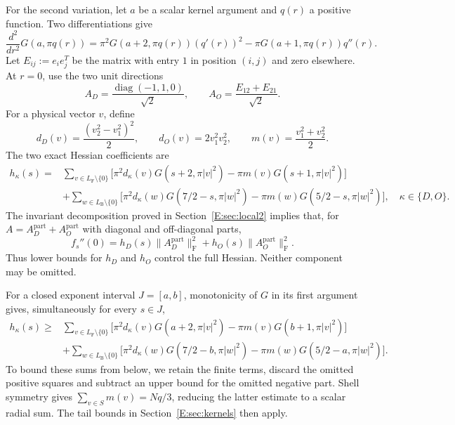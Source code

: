 \documentclass[reqno,english]{amsart}
\theoremstyle{definition}
\newtheorem{open problem}[theorem]{Open Problem}
\theoremstyle{remark}
\theoremstyle{plain}
\numberwithin{equation}{section}
\newcommand{\FCC}{L_{\mathrm F}}
\newcommand{\B}{L_{\mathrm B}}
\newcommand{\diag}{\operatorname{diag}}
\newcommand{\norm}[1]{\lVert#1\rVert_{\mathrm F}}
\begin{document}
For the second variation, let $a$ be a scalar kernel argument and
$q(r)$ a positive function. Two differentiations give
\begin{equation}
 \frac{d^2}{dr^2}G(a,\pi q(r))
 =\pi^2G(a+2,\pi q(r))(q'(r))^2
  -\pi G(a+1,\pi q(r))q''(r).
 \label{E:eq:second-variation-direct}
\end{equation}
Let $E_{ij}:=e_ie_j^T$ be the matrix with entry $1$ in position $(i,j)$
and zero elsewhere. At $r=0$, use the two unit directions
\[
 A_D=\frac{\diag(-1,1,0)}{\sqrt2},\qquad
 A_O=\frac{E_{12}+E_{21}}{\sqrt2}.
\]
For a physical vector $v$, define
\[
 d_D(v)=\frac{(v_2^2-v_1^2)^2}{2},\qquad
 d_O(v)=2v_1^2v_2^2,\qquad
 m(v)=\frac{v_1^2+v_2^2}{2}.
\]
The two exact Hessian coefficients are
\begin{align}
 h_\kappa(s)={}&
 \sum_{v\in\FCC\setminus\{0\}}
 \bigl[\pi^2d_\kappa(v)G(s+2,\pi|v|^2)
       -\pi m(v)G(s+1,\pi|v|^2)\bigr]\nonumber\\
 &+\sum_{w\in\B\setminus\{0\}}
 \bigl[\pi^2d_\kappa(w)G(7/2-s,\pi|w|^2)
       -\pi m(w)G(5/2-s,\pi|w|^2)\bigr],
 \quad\kappa\in\{D,O\}.
 \label{E:eq:hessian-explicit-new}
\end{align}
The invariant decomposition proved in Section~\ref{E:sec:local2} implies that,
for $A=A_D^{\mathrm{part}}+A_O^{\mathrm{part}}$ with diagonal and off-diagonal
parts,
\[
 f_s''(0)=h_D(s)\norm{A_D^{\mathrm{part}}}^2
          +h_O(s)\norm{A_O^{\mathrm{part}}}^2.
\]
Thus lower bounds for $h_D$ and $h_O$ control the full Hessian.
Neither component may be omitted.

For a closed exponent interval $J=[a,b]$, monotonicity of $G$ in its first
argument gives, simultaneously for every $s\in J$,
\begin{align}
 h_\kappa(s)\ge{}&
 \sum_{v\in\FCC\setminus\{0\}}
 \bigl[\pi^2d_\kappa(v)G(a+2,\pi|v|^2)
       -\pi m(v)G(b+1,\pi|v|^2)\bigr]\nonumber\\
 &+\sum_{w\in\B\setminus\{0\}}
 \bigl[\pi^2d_\kappa(w)G(7/2-b,\pi|w|^2)
       -\pi m(w)G(5/2-a,\pi|w|^2)\bigr].
 \label{E:eq:hessian-cell-new}
\end{align}
To bound these sums from below, we retain the finite terms, discard
the omitted positive squares and subtract an upper bound for the
omitted negative part. Shell symmetry gives
$\sum_{v\in S}m(v)=Nq/3$, reducing the latter estimate to a scalar
radial sum. The tail bounds in Section~\ref{E:sec:kernels} then
apply.
\end{document}
